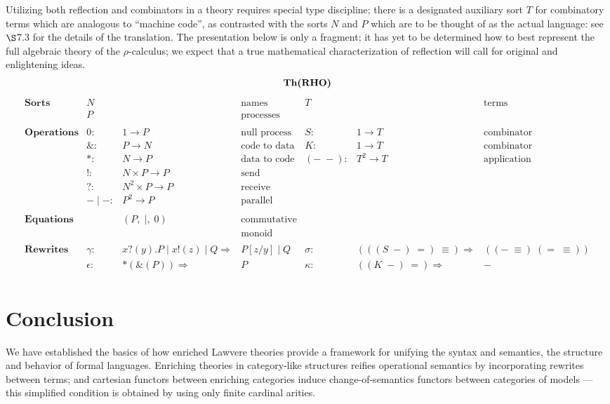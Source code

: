 \documentclass{amsart}
\theoremstyle{definition}
\newcommand{\maps}{\colon}
\begin{document}
Utilizing both reflection and combinators in a theory requires special type discipline; there is a designated auxiliary sort $T$ for combinatory terms which are analogous to ``machine code'', as contrasted with the sorts $N$ and $P$ which are to be thought of as the actual language: see \cite{roswelt} $\S$7.3 for the details of the translation. The presentation below is only a fragment; it has yet to be determined how to best represent the full algebraic theory of the $\rho$-calculus; we expect that a true mathematical characterization of reflection will call for original and enlightening ideas.\\

\[\textbf{\text{Th(RHO)}}\]
\[\begin{array}{lrllrll}
	\textbf{Sorts} & N && \text{names} & T && \text{terms}\\
	& P && \text{processes} &&&\\\\
	\textbf{Operations} & 0\maps & 1 \to P & \text{null process} & S\maps & 1\to T & \text{combinator}\\
	& \&\maps & P \to N & \text{code to data} & K\maps & 1\to T & \text{combinator}\\
	& *\maps & N \to P & \text{data to code} & (-\;-)\maps & T^2 \to T & \text{application}\\
	& !\maps & N\times P \to P & \text{send} &&&\\
	& ?\maps & N^2\times P \to P & \text{receive} &&&\\
		& -\; |\; - \maps & P^2 \to P & \text{parallel} &&&\\\\
	\textbf{Equations} && (P,\; |,\; 0) & \text{commutative} &&&\\
	&&& \text{monoid} &&&\\\\
	\textbf{Rewrites} & \gamma\maps & x?(y).P\; |\; x!(z)\; |\; Q \Rightarrow & P[z/y]\; |\; Q & \sigma\maps & (((S\; -)\; =)\; \equiv) \Rightarrow & ((-\; \equiv)\;(=\; \equiv))\\
	& \epsilon\maps & *(\&(P)) \Rightarrow & P & \kappa\maps & ((K\; -)\; =) \Rightarrow & -\\
\end{array}\]

\section{Conclusion}

We have established the basics of how enriched Lawvere theories provide a framework for unifying the syntax and semantics, the structure and behavior of formal languages. Enriching theories in category-like structures reifies operational semantics by incorporating rewrites between terms; and cartesian functors between enriching categories induce change-of-semantics functors between categories of models --- this simplified condition is obtained by using only finite cardinal arities.
\end{document}
